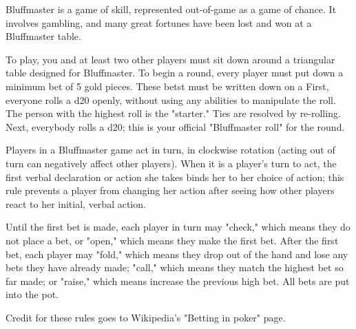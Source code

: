 \documentclass[green]{Kos}
\begin{document}
\name{\gBluffmaster{}}

Bluffmaster is a game of skill, represented out-of-game as a game of chance. It involves gambling, and many great fortunes have been lost and won at a Bluffmaster table.

To play, you and at least two other players must sit down around a triangular table designed for Bluffmaster. To begin a round, every player must put down a minimum bet of 5 gold pieces. These betst must be written down on a First, everyone rolls a d20 openly, without using any abilities to manipulate the roll. The person with the highest roll is the "starter." Ties are resolved by re-rolling. Next, everybody rolls a d20; this is your official "Bluffmaster roll" for the round.

Players in a Bluffmaster game act in turn, in clockwise rotation (acting out of turn can negatively affect other players). When it is a player's turn to act, the first verbal declaration or action she takes binds her to her choice of action; this rule prevents a player from changing her action after seeing how other players react to her initial, verbal action.

Until the first bet is made, each player in turn may "check," which means they do not place a bet, or "open," which means they make the first bet. After the first bet, each player may "fold," which means they drop out of the hand and lose any bets they have already made; "call," which means they match the highest bet so far made; or "raise," which means increase the previous high bet. All bets are put into the pot.



\begin{itemz}[Notes]
\item Credit for these rules goes to Wikipedia's "Betting in poker" page.
\end{itemz}
\end{document}
